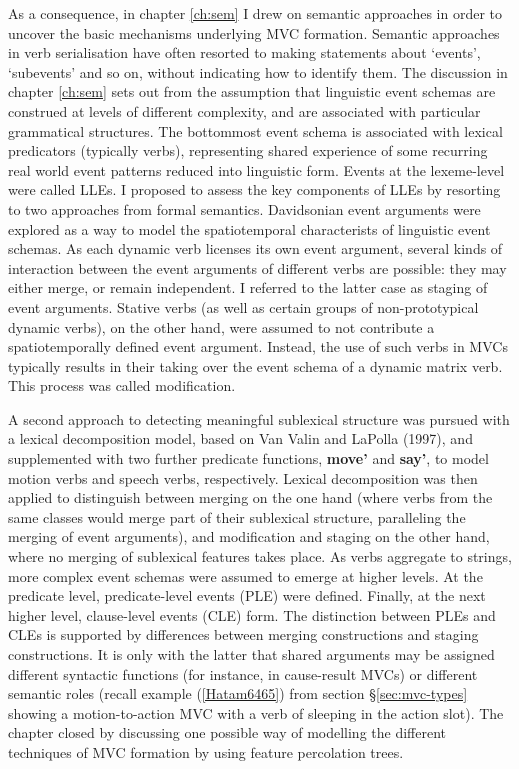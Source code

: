 As a consequence, in chapter \ref{ch:sem} I drew on semantic approaches in order to uncover the basic mechanisms underlying MVC formation. Semantic approaches in verb serialisation have often resorted to making statements about `events', `subevents' and so on, without indicating how to identify them. The discussion in chapter \ref{ch:sem} sets out from the assumption that linguistic event schemas are construed at levels of different complexity, and are associated with particular grammatical structures. The bottommost event schema is associated with lexical predicators (typically verbs), representing shared experience of some recurring real world event patterns reduced into linguistic form. Events at the lexeme-level were called LLEs. I proposed to assess the key components of LLEs by resorting to two approaches from formal semantics. Davidsonian event arguments were explored as a way to model the spatiotemporal characterists of linguistic event schemas. As each dynamic verb licenses its own event argument, several kinds of interaction between the event arguments of different verbs are possible: they may either merge, or remain independent. I referred to the latter case as staging of event arguments. Stative verbs (as well as certain groups of non-prototypical dynamic verbs), on the other hand, were assumed to not contribute a spatiotemporally defined event argument. Instead, the use of such verbs in MVCs typically results in their taking over the event schema of a dynamic matrix verb. This process was called modification. 

A second approach to detecting meaningful sublexical structure was pursued with a lexical decomposition model, based on Van Valin and LaPolla (1997), and supplemented with two further predicate functions, \textbf{move'} and \textbf{say'}, to model motion verbs and speech verbs, respectively. Lexical decomposition was then applied to distinguish between merging on the one hand (where verbs from the same classes would merge part of their sublexical structure, paralleling the merging of event arguments), and modification and staging on the other hand, where no merging of sublexical features takes place. As verbs aggregate to strings, more complex event schemas were assumed to emerge at higher levels. At the predicate level, predicate-level events (PLE) were defined. Finally, at the next higher level, clause-level events (CLE) form. The distinction between PLEs and CLEs is supported by differences between merging constructions and staging constructions. It is only with the latter that shared arguments may be assigned different syntactic functions (for instance, in cause-result MVCs) or different semantic roles (recall example (\ref{Hatam6465}) from section §\ref{sec:mvc-types} showing a motion-to-action MVC with a verb of sleeping in the action slot). The chapter closed by discussing one possible way of modelling the different techniques of MVC formation by using feature percolation trees.

